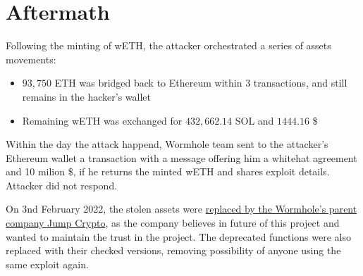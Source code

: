 \documentclass[fleqn,10pt]{olplainarticle}
\begin{document}
\section*{Aftermath}

Following the minting of wETH, the attacker orchestrated a series of assets movements:
\begin{itemize}
  \item $93,750$ ETH was bridged back to Ethereum within 3 transactions, and still remains  in the hacker's wallet
  \item Remaining wETH was exchanged for $432,662.14$ SOL and $1444.16$ \$
\end{itemize}

Within the day the attack happend, Wormhole team sent to the attacker's Ethereum wallet a transaction  with a message offering him a whitehat agreement and 10 milion \$, if he returns the minted wETH and shares exploit details. Attacker did not respond.

On 3nd February 2022, the stolen assets were \href{https://twitter.com/jump_/status/1489301013408497666?}{replaced by the Wormhole's parent company Jump Crypto}, as the company believes in future of this project and wanted to maintain the trust in the project. The deprecated functions were also replaced with their checked versions, removing possibility of anyone using the same exploit again.


\end{document}
